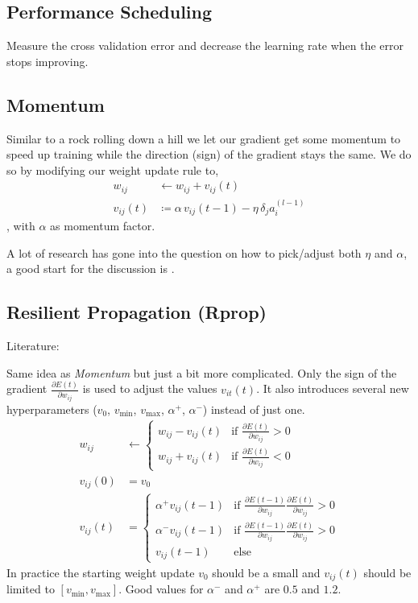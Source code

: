 \subsection{Performance Scheduling}
Measure the cross validation error and decrease the learning rate when the error stops improving.

\subsection{Momentum}\label{sec:momentum}
Similar to a rock rolling down a hill we let our gradient get some momentum to speed up training while the direction (sign) of the gradient stays the same. We do so by modifying our weight update rule to,
\begin{align}\label{eq:momentum}
w_{ij} &\leftarrow w_{ij} + v_{ij}(t)\\
v_{ij}(t) &\coloneqq \alpha\, v_{ij}(t-1) - \eta\, \delta_j a_i^{(l-1)}
\end{align}
, with $\alpha$ as momentum factor.

A lot of research has gone into the question on how to pick/adjust both $\eta$ and $\alpha$, a good start for the discussion is \cite{Yu1997}.

\subsection{Resilient Propagation (Rprop)}\label{sec:rprop}
Literature: \cite{Riedmiller1994}

Same idea as \emph{Momentum} but just a bit more complicated. Only the sign of the gradient $\frac{\partial E(t)}{\partial w_{ij}}$ is used to adjust the values $v_{it}(t)$. It also introduces several new hyperparameters ($v_0$, $v_{\text{min}}$, $v_{\text{max}}$, $\alpha^+$, $\alpha^-$) instead of just one.
\begin{align}
w_{ij} &\leftarrow \begin{cases}
	w_{ij} - v_{ij}(t) & \text{if } \frac{\partial E(t)}{\partial w_{ij}} > 0\\
	w_{ij} + v_{ij}(t) & \text{if } \frac{\partial E(t)}{\partial w_{ij}} < 0
	\end{cases}\\
v_{ij}(0) &= v_0\\
v_{ij}(t) &= \begin{cases}
	\alpha^+ v_{ij}(t-1) & \text{if } \frac{\partial E(t-1)}{\partial w_{ij}} \frac{\partial E(t)}{\partial w_{ij}} > 0\\
	\alpha^- v_{ij}(t-1) & \text{if } \frac{\partial E(t-1)}{\partial w_{ij}} \frac{\partial E(t)}{\partial w_{ij}} > 0\\
	v_{ij}(t-1) & \text{else}
	\end{cases}
\end{align}
In practice the starting weight update $v_0$ should be a small and $v_{ij}(t)$ should be limited to $[v_{\text{min}}, v_{\text{max}}]$. Good values for $\alpha^-$ and $\alpha^+$ are $0.5$ and $1.2$.

